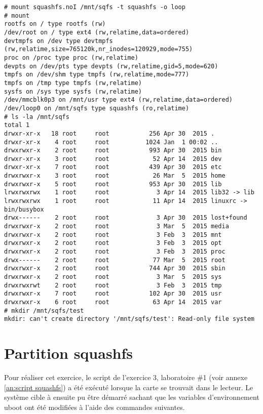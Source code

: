 \begin{lstlisting}[style=Bash,caption=squashfs.noI]
# mount squashfs.noI /mnt/sqfs -t squashfs -o loop
# mount
rootfs on / type rootfs (rw)
/dev/root on / type ext4 (rw,relatime,data=ordered)
devtmpfs on /dev type devtmpfs (rw,relatime,size=765120k,nr_inodes=120929,mode=755)
proc on /proc type proc (rw,relatime)
devpts on /dev/pts type devpts (rw,relatime,gid=5,mode=620)
tmpfs on /dev/shm type tmpfs (rw,relatime,mode=777)
tmpfs on /tmp type tmpfs (rw,relatime)
sysfs on /sys type sysfs (rw,relatime)
/dev/mmcblk0p3 on /mnt/usr type ext4 (rw,relatime,data=ordered)
/dev/loop0 on /mnt/sqfs type squashfs (ro,relatime)
# ls -la /mnt/sqfs
total 1
drwxr-xr-x   18 root     root           256 Apr 30  2015 .
drwxr-xr-x    4 root     root          1024 Jan  1 00:02 ..
drwxrwxr-x    2 root     root           993 Apr 30  2015 bin
drwxr-xr-x    3 root     root            52 Apr 14  2015 dev
drwxr-xr-x    7 root     root           439 Apr 30  2015 etc
drwxrwxr-x    3 root     root            26 Mar  5  2015 home
drwxrwxr-x    5 root     root           953 Apr 30  2015 lib
lrwxrwxrwx    1 root     root             3 Apr 14  2015 lib32 -> lib
lrwxrwxrwx    1 root     root            11 Apr 14  2015 linuxrc -> bin/busybox
drwx------    2 root     root             3 Apr 30  2015 lost+found
drwxrwxr-x    2 root     root             3 Mar  5  2015 media
drwxrwxr-x    2 root     root             3 Feb  3  2015 mnt
drwxrwxr-x    2 root     root             3 Feb  3  2015 opt
drwxrwxr-x    2 root     root             3 Feb  3  2015 proc
drwx------    2 root     root            77 Mar  5  2015 root
drwxrwxr-x    2 root     root           744 Apr 30  2015 sbin
drwxrwxr-x    2 root     root             3 Mar  5  2015 sys
drwxrwxrwt    2 root     root             3 Feb  3  2015 tmp
drwxrwxr-x    7 root     root           102 Apr 30  2015 usr
drwxrwxr-x    6 root     root            63 Apr 14  2015 var
# mkdir /mnt/sqfs/test
mkdir: can't create directory '/mnt/sqfs/test': Read-only file system
\end{lstlisting}

\section{Partition squashfs}
Pour réaliser cet exercice, le script de l'exercice 3, laboratoire \#1 (voir annexe \ref{an:script squashfs}) a été exécuté lorsque la carte \usd se trouvait dans le lecteur. Le système cible à ensuite pu être démarré sachant que les variables d'environnement uboot ont été modifiées à l'aide des commandes suivantes.


